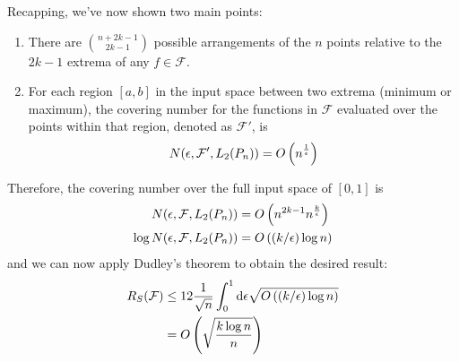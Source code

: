 \documentclass[11pt]{article}
\newcommand{\1}{\mathbb{I}} %
\begin{document}
Recapping, we've now shown two main points:
\begin{enumerate}
	\item There are ${n + 2k - 1 \choose 2k -1}$ possible arrangements of the $n$ points relative to the $2k -1$ extrema of any $f \in \mathcal F$. 
	
	\item For each region $[a, b]$ in the input space between two extrema (minimum or maximum), the covering number for the functions in $\mathcal F$ evaluated over the points within that region, denoted as $\mathcal F'$, is
	\begin{align}
		N(\epsilon, \mathcal F', L_2(P_n)) = O\left(  n^{\frac{1}{\epsilon}}  \right)
	\end{align}
\end{enumerate}
Therefore, the covering number over the full input space of $[0, 1]$ is
\begin{align}
	N(\epsilon, \mathcal F, L_2(P_n))
		&= O\left(  n^{2k -1} n^{\frac{k}{\epsilon}}  \right) \\
	\log N(\epsilon, \mathcal F, L_2(P_n))
		&= O\left(  (k/\epsilon) \log n  \right) 
\end{align}
and we can now apply Dudley's theorem to obtain the desired result:
\begin{align}
	R_S(\mathcal F)
		&\leq 12 \frac{1}{\sqrt{n}}  \int_{0}^{1} \mathrm{d}{\epsilon} \sqrt{ O\left(  (k/\epsilon) \log n  \right)    } \\
		&= O\left(  \sqrt{ \frac{k \log n}{n} }  \right)
\end{align}
 
\end{document}
